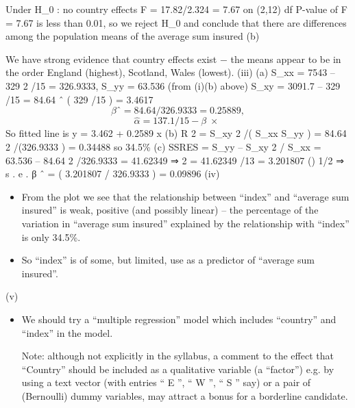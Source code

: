 \documentclass[a4paper,12pt]{article}
\begin{document}
Under H_0 : no country effects F = 17.82/2.324 = 7.67 on (2,12) df
P-value of F = 7.67 is less than 0.01, so we reject H_0 and conclude that there are differences among the population means of the average sum insured
(b)

We have strong evidence that country effects exist − the means appear to be in the order England (highest), Scotland, Wales (lowest).
(iii)
(a)
S_{xx} = 7543 – 329 2 /15 = 326.9333, S_{yy} = 63.536 (from (i)(b) above)
S_{xy} = 3091.7 – 329\; \times {}/15 = 84.64
ˆ ( 329 /15 ) = 3.4617
\[β ˆ = 84.64 / 326.9333 = 0.25889 ,\] 
\[\hat{\alpha}= 137.1/15 − β\; \times \;\]
So fitted line is y = 3.462 + 0.2589 x
(b) R 2 = S_{xy} 2 /( S_{xx} S_{yy} ) = 84.64 2 /(326.9333\; \times {}) = 0.34488 so 34.5\%
(c) SSRES = S_{yy} – S_{xy} 2 / S_{xx} = 63.536 – 84.64 2 /326.9333 = 41.62349
⇒ \hat{\sigma} 2 = 41.62349 /13 = 3.201807
()
1/2
⇒ s . e . β ˆ = ( 3.201807 / 326.9333 ) = 0.09896
(iv)
\begin{itemize}
\item From the plot we see that the relationship between “index” and “average sum insured” is weak, positive (and possibly linear) – the percentage of the variation in “average sum insured” explained by the relationship with “index”
is only 34.5\%.
\item So “index” is of some, but limited, use as a predictor of “average sum
insured”.
\end{itemize}
(v)
\begin{itemize}
\item We should try a “multiple regression” model which includes “country” and
“index” in the model.
\item[ Note: although not explicitly in the syllabus, a comment to the effect that “Country” should be included as a qualitative variable (a “factor”) e.g. by using a text vector (with entries “ E ”, “ W ”, “ S ” say) or a pair of (Bernoulli)
dummy variables, may attract a bonus for a borderline candidate.]
\end{itemize}
\end{document}
